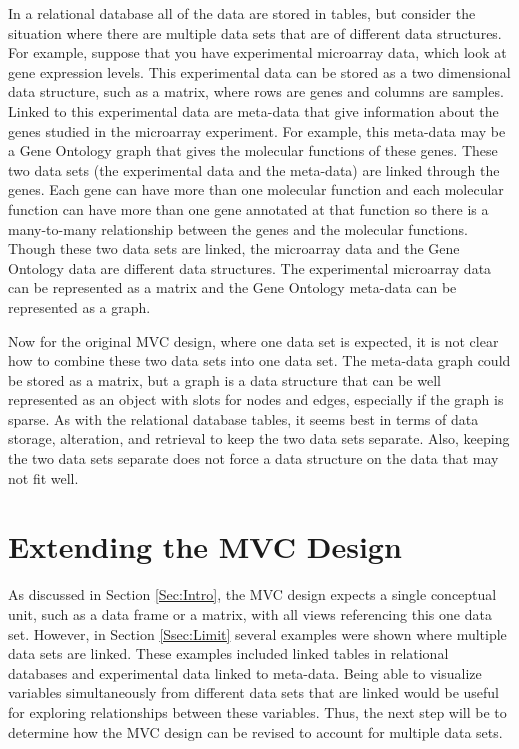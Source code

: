 \documentclass{article}[11pt]
\begin{document}
In a relational database all of the data are stored in tables, but consider the
situation where there are multiple data sets that are of different data
structures.  For example, suppose that you have experimental microarray data,
which look at gene expression levels.  This experimental data can be
stored as a two dimensional data structure, such as a matrix, where rows are
genes and columns are samples.  Linked to this experimental data are meta-data
that give information about the genes studied in the microarray experiment.
For example, this meta-data may be a Gene Ontology graph that gives the
molecular functions of these genes.  These two data sets (the experimental
data and the meta-data) are linked through the genes.  Each gene can have more
than one molecular function and each molecular function can have more than one
gene annotated at that function so there is a many-to-many relationship
between the genes and the molecular functions.  Though these two data sets are
linked, the microarray data and the Gene Ontology data are different data
structures.  The experimental microarray data can be represented as a matrix
and the Gene Ontology meta-data can be represented as a graph.  

Now for the original MVC design, where one data set is expected, it is not
clear how to combine these two data sets into one data set.  The meta-data
graph could be stored as a matrix, but a graph is a data structure that can be
well represented as an object with slots for nodes and edges, especially if
the graph is sparse.  As with the relational database tables, it seems
best in terms of data storage, alteration, and retrieval to keep the two data
sets separate.  Also, keeping the two data sets separate does not force a data
structure on the data that may not fit well.  

\section{Extending the MVC Design}\label{Sec:Extend}

As discussed in Section \ref{Sec:Intro}, the MVC design expects a single
conceptual unit, such as a data frame or a matrix,
with all views referencing this one data set.  However, in Section
\ref{Ssec:Limit} several examples were shown where multiple data sets are
linked.  These examples included linked tables in relational databases and
experimental data linked to meta-data.  Being able to visualize variables
simultaneously from different data sets that are linked would be useful for
exploring relationships between these variables.  Thus, the next step will be
to determine how the MVC design can be revised to account for multiple data
sets. 
\end{document}
